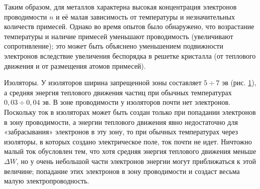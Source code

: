 \documentclass[a4paper,10pt]{book}
\begin{document}
\begin{figure}[h]
	\caption{}
	\label{pic55}
\end{figure}

Таким образом, для металлов характерна высокая концентрация электронов проводимости $n$ и её малая зависимость от температуры и незначительных количеств примесей. Однако во время опытов было обнаружено, что возрастание температуры и наличие примесей уменьшают проводимость (увеличивают сопротивление); это может быть объяснено уменьшением подвижности электронов вследствие увеличения беспорядка в решетке кристалла (от теплового движения и от размещения атомов примесей).

$\textbf{Изоляторы.}$ У изоляторов ширина запрещенной зоны составляет $5 \div 7 \textit{ эв}$ (рис. \ref{pic55}), а средняя энергия теплового движения частиц при обычных температурах $0,03 \div 0,04 \textit{ эв}$. В зоне проводимости у изоляторов почти нет электронов. Поскольку ток в изоляторах может быть создан только при попадании электронов в зону проводимости, а энергии теплового движения явно недостаточно для «забрасывания» электронов в эту зону, то при обычных температурах через изоляторы, в которых создано электрическое поле, ток почти не идет. Ничтожно малый ток обусловлен тем, что хотя средняя энергия теплового движения меньше $\Delta W$, но у очень небольшой части электронов энергии могут приближаться к этой величине; попадание этих электронов в зону проводимости и создаст весьма малую электропроводность.
\end{document}
